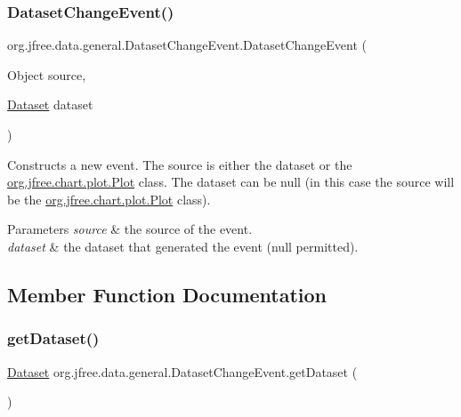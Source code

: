\subsubsection{\texorpdfstring{Dataset\+Change\+Event()}{DatasetChangeEvent()}}
{\footnotesize\ttfamily org.\+jfree.\+data.\+general.\+Dataset\+Change\+Event.\+Dataset\+Change\+Event (\begin{DoxyParamCaption}\item[{Object}]{source,  }\item[{\mbox{\hyperlink{interfaceorg_1_1jfree_1_1data_1_1general_1_1_dataset}{Dataset}}}]{dataset }\end{DoxyParamCaption})}

Constructs a new event. The source is either the dataset or the \mbox{\hyperlink{classorg_1_1jfree_1_1chart_1_1plot_1_1_plot}{org.\+jfree.\+chart.\+plot.\+Plot}} class. The dataset can be {\ttfamily null} (in this case the source will be the \mbox{\hyperlink{classorg_1_1jfree_1_1chart_1_1plot_1_1_plot}{org.\+jfree.\+chart.\+plot.\+Plot}} class).


\begin{DoxyParams}{Parameters}
{\em source} & the source of the event. \\
\hline
{\em dataset} & the dataset that generated the event ({\ttfamily null} permitted). \\
\hline
\end{DoxyParams}


\subsection{Member Function Documentation}
\mbox{\label{classorg_1_1jfree_1_1data_1_1general_1_1_dataset_change_event_ad775b83cdff537ec5eb5ff53316986c7}} 
\subsubsection{\texorpdfstring{get\+Dataset()}{getDataset()}}
{\footnotesize\ttfamily \mbox{\hyperlink{interfaceorg_1_1jfree_1_1data_1_1general_1_1_dataset}{Dataset}} org.\+jfree.\+data.\+general.\+Dataset\+Change\+Event.\+get\+Dataset (\begin{DoxyParamCaption}{ }\end{DoxyParamCaption})}

